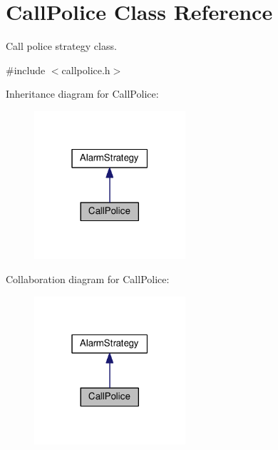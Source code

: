 \hypertarget{classCallPolice}{}\section{Call\+Police Class Reference}
\label{classCallPolice}


Call police strategy class.  




{\ttfamily \#include $<$callpolice.\+h$>$}



Inheritance diagram for Call\+Police\+:\nopagebreak
\begin{figure}[H]
\begin{center}
\leavevmode
\includegraphics[width=159pt]{classCallPolice__inherit__graph}
\end{center}
\end{figure}


Collaboration diagram for Call\+Police\+:\nopagebreak
\begin{figure}[H]
\begin{center}
\leavevmode
\includegraphics[width=159pt]{classCallPolice__coll__graph}
\end{center}
\end{figure}
